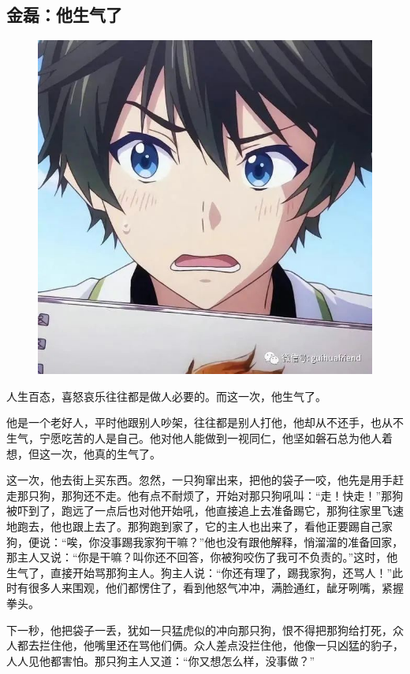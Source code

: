 \vspace{10pt}

{\centering\subsection*{金磊：他生气了}}


\renewcommand{\leftmark}{金磊：他生气了}

\begin{figure}[htbp]

\centering

\includegraphics[width = .5\textwidth]{./ch/9.jpg}

\end{figure}



人生百态，喜怒哀乐往往都是做人必要的。而这一次，他生气了。

他是一个老好人，平时他跟别人吵架，往往都是别人打他，他却从不还手，也从不生气，宁愿吃苦的人是自己。他对他人能做到一视同仁，他坚如磐石总为他人着想，但这一次，他真的生气了。

这一次，他去街上买东西。忽然，一只狗窜出来，把他的袋子一咬，他先是用手赶走那只狗，那狗还不走。他有点不耐烦了，开始对那只狗吼叫：“走！快走！”那狗被吓到了，跑远了一点后也对他开始吼，他直接追上去准备踢它，那狗往家里飞速地跑去，他也跟上去了。那狗跑到家了，它的主人也出来了，看他正要踢自己家狗，便说：“唉，你没事踢我家狗干嘛？”他也没有跟他解释，悄溜溜的准备回家，那主人又说：“你是干嘛？叫你还不回答，你被狗咬伤了我可不负责的。”这时，他生气了，直接开始骂那狗主人。狗主人说：“你还有理了，踢我家狗，还骂人！”此时有很多人来围观，他们都愣住了，看到他怒气冲冲，满脸通红，龇牙咧嘴，紧握拳头。

下一秒，他把袋子一丢，犹如一只猛虎似的冲向那只狗，恨不得把那狗给打死，众人都去拦住他，他嘴里还在骂他们俩。众人差点没拦住他，他像一只凶猛的豹子，人人见他都害怕。那只狗主人又道：“你又想怎么样，没事做？”

